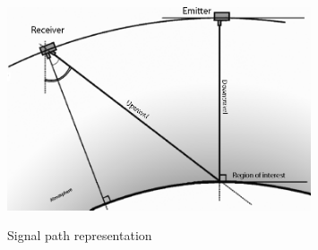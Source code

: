 \begin{figure}[ht!]
	\centering
		\includegraphics[width=0.8\textwidth]{chapters/img/signalPath.png}
		\label{fig:signalPath}
	\caption{Signal path representation}
\end{figure}










